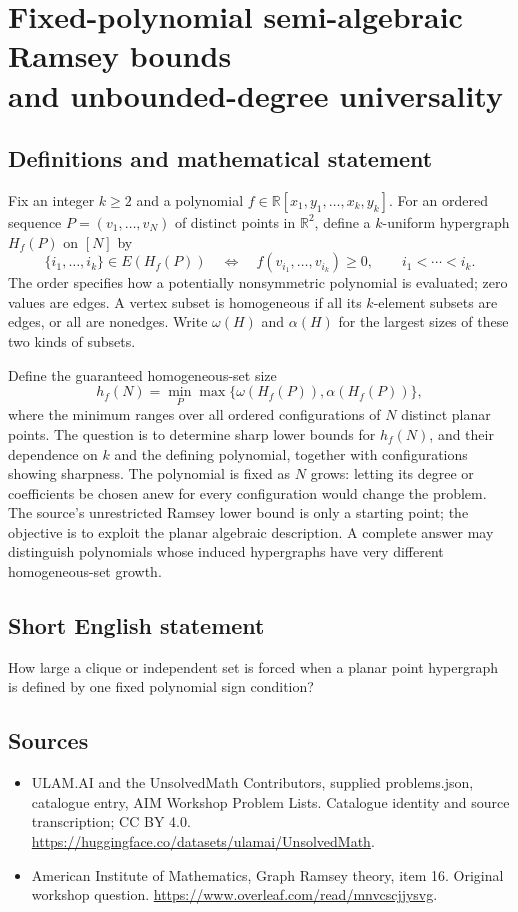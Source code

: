 \documentclass[11pt,a4paper]{article}
\begin{document}
\section*{Fixed-polynomial semi-algebraic Ramsey bounds\\ and unbounded-degree universality}\label{statement}

\subsection{Definitions and mathematical statement}
Fix an integer $k\geq2$ and a polynomial $f\in\mathbb R[x_1,y_1,\ldots,x_k,y_k]$.
For an ordered sequence $P=(v_1,\ldots,v_N)$ of distinct points in $\mathbb R^2$, define a $k$-uniform hypergraph $H_f(P)$ on $[N]$ by
\[
 \{i_1,\ldots,i_k\}\in E(H_f(P))
 \quad\Longleftrightarrow\quad
 f(v_{i_1},\ldots,v_{i_k})\geq0,
 \qquad i_1<\cdots<i_k.
\]
The order specifies how a potentially nonsymmetric polynomial is evaluated; zero values are edges.
A vertex subset is homogeneous if all its $k$-element subsets are edges, or all are nonedges.
Write $\omega(H)$ and $\alpha(H)$ for the largest sizes of these two kinds of subsets.

Define the guaranteed homogeneous-set size
\[
 h_f(N)=\min_P\max\{\omega(H_f(P)),\alpha(H_f(P))\},
\]
where the minimum ranges over all ordered configurations of $N$ distinct planar points.
The question is to determine sharp lower bounds for $h_f(N)$, and their dependence on $k$ and the defining polynomial, together with configurations showing sharpness.
The polynomial is fixed as $N$ grows: letting its degree or coefficients be chosen anew for every configuration would change the problem.
The source's unrestricted Ramsey lower bound is only a starting point; the objective is to exploit the planar algebraic description.
A complete answer may distinguish polynomials whose induced hypergraphs have very different homogeneous-set growth.
\subsection{Short English statement}
How large a clique or independent set is forced when a planar point hypergraph is defined by one fixed polynomial sign condition?
\subsection{Sources}
\begin{itemize}
\item[S1] ULAM.AI and the UnsolvedMath Contributors, supplied problems.json, catalogue entry, AIM Workshop Problem Lists. Catalogue identity and source transcription; CC BY 4.0.
\url{https://huggingface.co/datasets/ulamai/UnsolvedMath}.
\item[S2] American Institute of Mathematics, Graph Ramsey theory, item 16. Original workshop question.
\url{https://www.overleaf.com/read/mnvcscjjysvg}.
\end{itemize}
\end{document}
